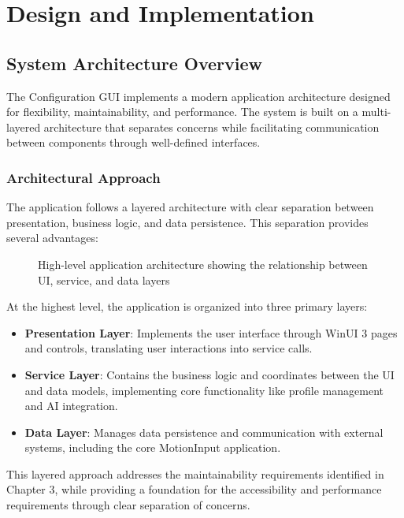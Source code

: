 \chapter{Design and Implementation}

\section{System Architecture Overview}
The Configuration GUI implements a modern application architecture designed for flexibility, maintainability, and performance. The system is built on a multi-layered architecture that separates concerns while facilitating communication between components through well-defined interfaces.

\subsection{Architectural Approach}
The application follows a layered architecture with clear separation between presentation, business logic, and data persistence. This separation provides several advantages:

\begin{figure}[h]
\centering
\caption{High-level application architecture showing the relationship between UI, service, and data layers}
\label{fig:app_architecture}
\end{figure}

At the highest level, the application is organized into three primary layers:

\begin{itemize}
    \item \textbf{Presentation Layer}: Implements the user interface through WinUI 3 pages and controls, translating user interactions into service calls.
    \item \textbf{Service Layer}: Contains the business logic and coordinates between the UI and data models, implementing core functionality like profile management and AI integration.
    \item \textbf{Data Layer}: Manages data persistence and communication with external systems, including the core MotionInput application.
\end{itemize}

This layered approach addresses the maintainability requirements identified in Chapter 3, while providing a foundation for the accessibility and performance requirements through clear separation of concerns.

